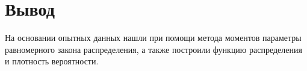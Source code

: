 \documentclass{article}
\begin{document}
\section*{Вывод}
На основании опытных данных нашли при помощи метода моментов параметры равномерного закона распределения, а также построили функцию распределения и плотность вероятности.
\end{document}
